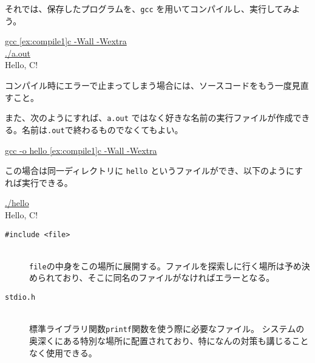 それでは、保存したプログラムを、\texttt{gcc} を用いてコンパイルし、実行してみよう。
\begin{commandline2}
    \prompt \underline{gcc \ref{ex:compile1}c -Wall -Wextra} \\
    \prompt \underline{./a.out} \\
    Hello, C!
\end{commandline2} \noindent
コンパイル時にエラーで止まってしまう場合には、ソースコードをもう一度見直すこと。

また、次のようにすれば、\texttt{a.out} ではなく好きな名前の実行ファイルが作成できる。名前は\texttt{.out}で終わるものでなくてもよい。
\begin{commandline2}
    \prompt \underline{gcc -o hello \ref{ex:compile1}c -Wall -Wextra}
\end{commandline2} \noindent
この場合は同一ディレクトリに \texttt{hello} というファイルができ、以下のようにすれば実行できる。
\begin{commandline2}
    \prompt \underline{./hello} \\
    Hello, C!
\end{commandline2}

\begin{description}
    \item[\texttt{\#include <file>}]\mbox{}\\ \texttt{file}の中身をこの場所に展開する。ファイルを探索しに行く場所は予め決められており、そこに同名のファイルがなければエラーとなる。
    \item[\texttt{stdio.h}]\mbox{}\\ 標準ライブラリ関数\texttt{printf}関数を使う際に必要なファイル。
          システムの奥深くにある特別な場所に配置されており、特になんの対策も講じることなく使用できる。
\end{description}

